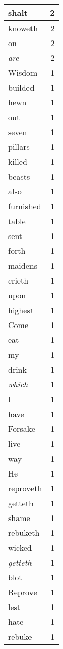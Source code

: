 \begin{center}
\begin{longtable}{l|r}
shalt & 2\\ \hline 
knoweth & 2\\ \hline 
on & 2\\ \hline 
\emph{are} & 2\\ \hline 
Wisdom & 1\\ \hline 
builded & 1\\ \hline 
hewn & 1\\ \hline 
out & 1\\ \hline 
seven & 1\\ \hline 
pillars & 1\\ \hline 
killed & 1\\ \hline 
beasts & 1\\ \hline 
also & 1\\ \hline 
furnished & 1\\ \hline 
table & 1\\ \hline 
sent & 1\\ \hline 
forth & 1\\ \hline 
maidens & 1\\ \hline 
crieth & 1\\ \hline 
upon & 1\\ \hline 
highest & 1\\ \hline 
Come & 1\\ \hline 
eat & 1\\ \hline 
my & 1\\ \hline 
drink & 1\\ \hline 
\emph{which} & 1\\ \hline 
I & 1\\ \hline 
have & 1\\ \hline 
Forsake & 1\\ \hline 
live & 1\\ \hline 
way & 1\\ \hline 
He & 1\\ \hline 
reproveth & 1\\ \hline 
getteth & 1\\ \hline 
shame & 1\\ \hline 
rebuketh & 1\\ \hline 
wicked & 1\\ \hline 
\emph{getteth} & 1\\ \hline 
blot & 1\\ \hline 
Reprove & 1\\ \hline 
lest & 1\\ \hline 
hate & 1\\ \hline 
rebuke & 1\\ \hline 

\end{longtable}
\end{center}
